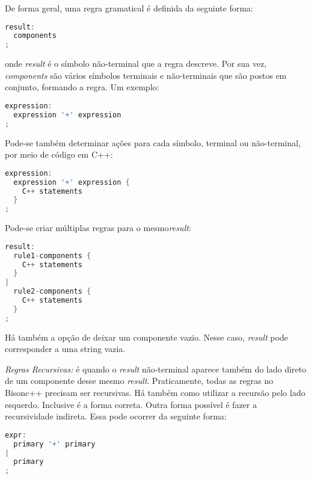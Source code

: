 \begin{apendicesenv}
De forma geral, uma regra gramatical é definida da seguinte forma:

\begin{lstlisting}[language=c,  caption=Definição de regra gramatical]
result:
  components
;
\end{lstlisting}

\par
\indent onde \textit{result} é o símbolo não-terminal que a regra descreve. Por sua vez,  \textit{components} são vários símbolos terminais e não-terminais que são postos em conjunto, formando a regra. Um exemplo:
\begin{lstlisting}[language=c,  caption=Exemplo de regra gramatical]
expression:
  expression '+' expression
;
\end{lstlisting}

\par 
\indent Pode-se também determinar ações para cada símbolo, terminal ou não-terminal, por meio de código em C++:
\begin{lstlisting}[language=c,  caption=Exemplo de regra gramatical utilizando C++]
expression:
  expression '+' expression {
    C++ statements
  }
;
\end{lstlisting}

\par 
\indent Pode-se criar múltiplas regras para o mesmo\textit{result}:

\begin{lstlisting}[language=c,  caption=Exemplo de regra gramatical utilizando múltiplas regras]
result:
  rule1-components {
    C++ statements
  }
|
  rule2-components {
    C++ statements
  }
;
\end{lstlisting}

\par 
\indent Há também a opção de deixar um componente vazio. Nesse caso, \textit{result} pode corresponder a uma string vazia.
\par 
\indent \textit{Regras Recursivas:} é quando o \textit{result} não-terminal aparece também do lado direto de um componente desse mesmo \textit{result}. Praticamente, todas as regras no Bisonc++ precisam ser recursivas. Há também como utilizar a recursão pelo lado esquerdo. Inclusive é a forma correta. Outra forma possível é fazer a recursividade indireta. Essa pode ocorrer da seguinte forma:

\begin{lstlisting}[language=c,  caption=Exemplo de regra gramatical utilizando recursividade]
expr:     
  primary '+' primary
|
  primary
;


\end{lstlisting}
\end{apendicesenv}
